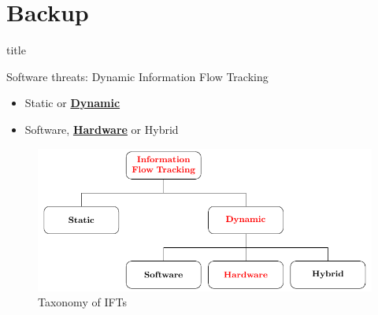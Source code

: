 \section*{Backup}

\begin{frame}[noframenumbering]{}
    \vfill
    \centering
    \begin{beamercolorbox}[sep=8pt,center,shadow=true,rounded=true]{title}
        \NoHyper\insertsection\par\endNoHyper
    \end{beamercolorbox}
    \vfill
\end{frame}
\begin{frame}[noframenumbering]{Software threats: Dynamic Information Flow Tracking}
    \begin{minipage}[c]{0.4\textwidth}
        \begin{block}{}
            \begin{itemize}
                [square]
                \justifying
                \item Static or \underline{\textbf{Dynamic}}
                \item Software, \underline{\textbf{Hardware}} or Hybrid
            \end{itemize}
        \end{block}
    \end{minipage}\hfill%
    \begin{minipage}[c]{0.55\textwidth}
        \begin{figure}
            \centering
            \includegraphics[width=\textwidth]{src/1_introduction/img/arborescence_ift.pdf}
            \caption{Taxonomy of IFTs}
            \label{fig:taxoDIFT}
        \end{figure}
    \end{minipage}
\end{frame}
